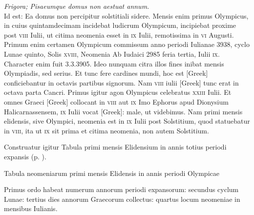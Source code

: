 \emph{Frigora; Pisaeumque domus non aestuat annum.}\\
Id est: Ea domus non percipitur solstitiali sidere.
Mensis enim primus
Olympicus, in cuius quintamdecimam incidebat ludicrum Olympicum,
incipiebat proxime post \textsc{viii} Iulii, ut citima neomenia esset
 in \textsc{ix}
Iulii, remotissima in \textsc{vi} Augusti.
Primum enim certamen Olympicum
commissum anno periodi Iulianae 3938, cyclo Lunae quinto, Solis \textsc{xviii},
Neomenia Ab Iudaici 2985 feria tertia, Iulii \textsc{ix}.
Character enim fuit
3.3.3905.
Ideo nunquam citra illos fines inibat mensis Olympiadis, sed
serius.
Et tunc fere cardines mundi, hoc est
 \textgreek{[Greek]} conficiebantur
in octavis partibus signorum.
Nam \textsc{viii} iulii \textgreek{[Greek]} tunc
erat in octava parta Cancri.
Primus igitur agon Olympicus celebratus
\textsc{xxiii} Iulii.
Et omnes Graeci \textgreek{[Greek]} collocant in \textsc{viii}
 aut \textsc{ix}
Imo Ephorus apud Dionysium Halicarnassensem, \textsc{ix} Iulii vocat
\textgreek{[Greek]}: male, ut videbimus.
Nam primi mensis elidensis, sive
Olympici, neomenia est in \textsc{ix} Iulii post Solstitium, quod statuebatur
in \textsc{viii}, ita ut \textsc{ix} sit prima et citima neomenia,
 non autem Solstitium.


Construatur igitur Tabula primi mensis Elidensium in annis totius periodi
expansis (p. \pageref{tab:neomenia_elidensis}).
\begin{table}[htbp]
\footnotesize
\centering

\caption{Tabula neomeniarum primi mensis Elidensis in annis periodi Olympicae}
\label{tab:neomenia_elidensis}
\end{table}
%
Primus ordo habeat numerum annorum periodi expansorum:
secundus cyclum Lunae: tertius dies annorum Graecorum collectus:
quartus locum neomeniae in mensibus Iulianis.


